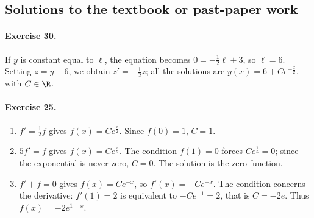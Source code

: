 \subsection{Solutions to the textbook or past-paper work}\paragraph{Exercise 30.} If $y$ is constant equal to $\ell$, the equation becomes $0=-\frac12\ell+3$, so $\ell=6$. Setting $z=y-6$, we obtain $z'=-\frac12z$; all the solutions are $y(x)=6+Ce^{-\frac x2}$, with $C\in\R$.
\paragraph{Exercise 25.}
\begin{enumerate}
\item $f'=\frac12f$ gives $f(x)=Ce^{\frac x2}$. Since $f(0)=1$, $C=1$.
\item $5f'=f$ gives $f(x)=Ce^{\frac x5}$. The condition $f(1)=0$ forces $Ce^{\frac15}=0$; since the exponential is never zero, $C=0$. The solution is the zero function.
\item $f'+f=0$ gives $f(x)=Ce^{-x}$, so $f'(x)=-Ce^{-x}$. The condition concerns the derivative: $f'(1)=2$ is equivalent to $-Ce^{-1}=2$, that is $C=-2e$. Thus $f(x)=-2e^{1-x}$.
\end{enumerate}

\fi

